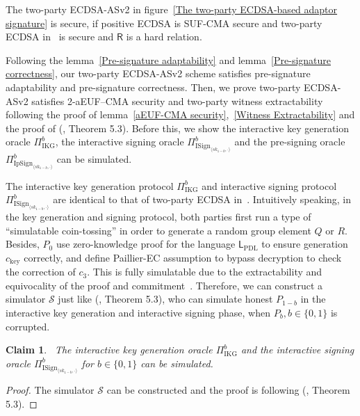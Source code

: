 \documentclass{llncs}
\newtheorem{Claim}{Claim}
\begin{document}
\begin{theorem}
The two-party ECDSA-ASv2 in figure~\ref{The two-party ECDSA-based adaptor signature} is secure, if positive ECDSA is SUF-CMA secure and two-party ECDSA in~\cite{Lin17} is secure and $\mathsf{R}$ is a hard relation.
\end{theorem}

Following the lemma~\ref{Pre-signature adaptability} and lemma~\ref{Pre-signature correctness}, our two-party ECDSA-ASv2 scheme satisfies pre-signature adaptability and pre-signature correctness. Then, we prove two-party ECDSA-ASv2 satisfies 2-aEUF–CMA security and two-party witness extractability following the proof of lemma~\ref{aEUF-CMA security},~\ref{Witness Extractability}  and the proof of (\cite{Lin17}, Theorem 5.3). Before this, we show the interactive key generation oracle $\Pi^b_{\text{IKG}}$, the interactive signing oracle $\Pi^b_{\text{ISign}_{\langle sk_{1-b},\cdot \rangle}}$ and the pre-signing oracle $\Pi^b_{\text{IpSign}_{\langle sk_{1-b},\cdot \rangle}}$ can be simulated. 

The interactive key generation protocol $\Pi^b_{\text{IKG}}$ and interactive signing protocol $\Pi^b_{\text{ISign}_{\langle sk_{1-b},\cdot \rangle}}$ are identical to that of two-party ECDSA in~\cite{Lin17}. Intuitively speaking, in the key generation and signing protocol, both parties first run a type of ``simulatable coin-tossing'' in order to generate a random group element $Q$ or $R$. Besides, $P_0$ use zero-knowledge proof for the language $\mathsf{L}_{\text{PDL}}$ to ensure generation $c_{\text{key}}$ correctly, and define Paillier-EC assumption to bypass decryption to check the correction of $c_3$. This is fully simulatable due to the extractability and equivocality of the proof and commitment~\cite{Lin17}. Therefore, we can construct a simulator $\mathcal{S}$ just like (\cite{Lin17}, Theorem 5.3), who can simulate honest $P_{1-b}$ in the interactive key generation and interactive signing phase, when $P_b, b\in\{0,1\}$ is corrupted. 

\begin{Claim}~\label{interactive key generation oracle}
The interactive key generation oracle $\Pi^b_{\text{IKG}}$ and the interactive signing oracle $\Pi^b_{\text{ISign}_{\langle sk_{1-b},\cdot \rangle}}$ for $b\in\{0,1\}$ can be simulated.
\end{Claim}

\begin{proof}
The simulator $\mathcal{S}$ can be constructed and the proof is following (\cite{Lin17}, Theorem 5.3).
\end{proof}
\end{document}
